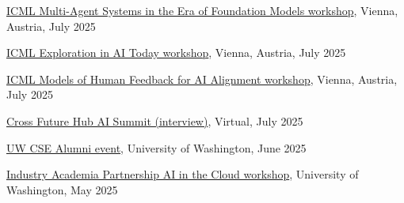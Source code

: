 \documentclass[paper=letter,fontsize=11pt]{scrartcl} %
\newcommand{\TalkEntry}[4]{
		\noindent \href{#4}{#1}, #2, #3 }
\begin{document}
\begin{etaremune}
\item \TalkEntry{ICML Multi-Agent Systems in the Era of Foundation Models workshop}{Vienna, Austria}{July 2025}{https://mas-2025.github.io/MAS-2025/}

\item \TalkEntry{ICML Exploration in AI Today workshop}{Vienna, Austria}{July 2025}{https://exait-workshop.github.io/}

\item \TalkEntry{ICML Models of Human Feedback for AI Alignment workshop}{Vienna, Austria}{July 2025}{https://sites.google.com/view/mhf-icml2025}

\item \TalkEntry{Cross Future Hub AI Summit (interview)}{Virtual}{July 2025}{https://www.cross-future.com/?wix-vod-video-id=a13f266fc86541dfa290ef3113c6cb58&wix-vod-comp-id=comp-m7ck5olv}

\item \TalkEntry{UW CSE Alumni event}{University of Washington}{June 2025}{}

\item \TalkEntry{Industry Academia Partnership AI in the Cloud workshop}{University of Washington}{May 2025}{https://www.industry-academia.org/uw-2025.html}


\end{etaremune}
\end{document}
